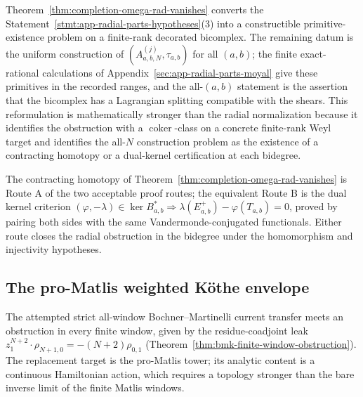 \begin{rmk}
\label{rmk:completion-omega-rad-status}
Theorem~\ref{thm:completion-omega-rad-vanishes} converts the
Statement~\ref{stmt:app-radial-parts-hypotheses}(3) into a
constructible primitive-existence problem on a finite-rank
decorated bicomplex.  The remaining datum is the uniform
construction of \((A^{(j)}_{a,b,N},\tau_{a,b})\) for all
\((a,b)\); the finite exact-rational calculations of
Appendix~\ref{sec:app-radial-parts-moyal} give these primitives in the
recorded ranges, and
the all-\((a,b)\) statement is the assertion that the bicomplex
has a Lagrangian splitting compatible with the shears.  This
reformulation is mathematically stronger than the radial
normalization because it identifies the obstruction with a
\(\operatorname{coker}\)-class on a concrete finite-rank Weyl
target and identifies the all-\(N\) construction problem as the
existence of a
contracting homotopy or a dual-kernel certification at each
bidegree.
\end{rmk}

\begin{rmk}
\label{rmk:completion-dual-kernel}
The contracting homotopy of
Theorem~\ref{thm:completion-omega-rad-vanishes} is Route A of the
two acceptable proof routes; the equivalent Route B is the dual
kernel criterion
\((\varphi,-\lambda)\in\ker B^*_{a,b}\Rightarrow
\lambda(E^+_{a,b})-\varphi(T_{a,b})=0\), proved by pairing both
sides with the same Vandermonde-conjugated functionals.  Either
route closes the radial obstruction in the bidegree under the
homomorphism and injectivity hypotheses.
\end{rmk}

\subsection{The pro-Matlis weighted K\"othe envelope}
\label{ssec:completion-promatlis}

The attempted strict all-window Bochner--Martinelli current transfer
meets an obstruction in every finite window, given by the
residue-coadjoint leak
\(z_1^{N+2}\cdot\rho_{N+1,0}=-(N+2)\rho_{0,1}\)
(Theorem~\ref{thm:bmk-finite-window-obstruction}).  The replacement target is
the pro-Matlis tower; its analytic content is a continuous
Hamiltonian action, which requires a topology stronger than the bare
inverse limit of the finite Matlis windows.

